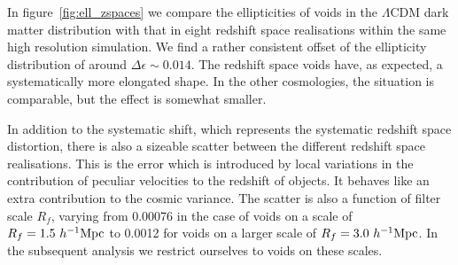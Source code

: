 In figure~\ref{fig:ell_zspaces} we compare the ellipticities of voids in the $\Lambda$CDM dark matter distribution with 
that in eight redshift space realisations within the same high resolution simulation. We find a rather consistent offset 
of the ellipticity distribution of around $\Delta \epsilon \sim 0.014$. The redshift space voids have, as expected, 
a systematically more elongated shape. In the other cosmologies, the situation is comparable, but the effect is somewhat smaller. 

In addition to the systematic shift, which represents the systematic redshift space distortion, there is also a sizeable 
scatter between the different redshift space realisations. This is the error which is introduced by local variations 
in the contribution of peculiar velocities to the redshift of objects. It behaves like an extra contribution to 
the cosmic variance. The scatter is also a function of filter scale $R_f$, varying from 0.00076 in the case of 
voids on a scale of $R_f=1.5~h^{-1} {\rm Mpc}$ to 0.0012 for voids on a larger scale of $R_f=3.0~h^{-1} {\rm Mpc}$. In the subsequent 
analysis we restrict ourselves to voids on these scales. 

